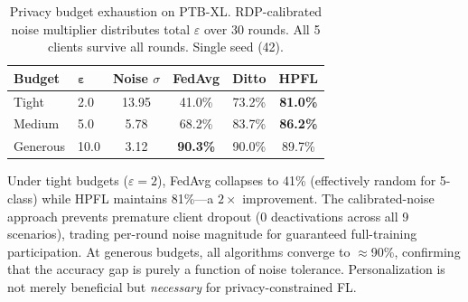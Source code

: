 \documentclass[conference,a4paper]{IEEEtran}
\begin{document}
\begin{table}[htbp]
\centering
\caption{Privacy budget exhaustion on PTB-XL. RDP-calibrated noise multiplier distributes total $\varepsilon$ over 30 rounds. All 5 clients survive all rounds. Single seed (42).}
\label{tab:budget_exhaustion}
\small
\begin{tabular}{llcccc}
\toprule
\textbf{Budget} & $\boldsymbol{\varepsilon}$ & \textbf{Noise $\sigma$} & \textbf{FedAvg} & \textbf{Ditto} & \textbf{HPFL} \\
\midrule
Tight & 2.0 & 13.95 & 41.0\% & 73.2\% & \textbf{81.0\%} \\
Medium & 5.0 & 5.78 & 68.2\% & 83.7\% & \textbf{86.2\%} \\
Generous & 10.0 & 3.12 & \textbf{90.3\%} & 90.0\% & 89.7\% \\
\bottomrule
\end{tabular}

\vspace{1mm}
\footnotesize{Under tight budgets ($\varepsilon{=}2$), FedAvg collapses to 41\% (effectively random for 5-class) while HPFL maintains 81\%---a $2\times$ improvement. The calibrated-noise approach prevents premature client dropout (0 deactivations across all 9 scenarios), trading per-round noise magnitude for guaranteed full-training participation. At generous budgets, all algorithms converge to $\approx$90\%, confirming that the accuracy gap is purely a function of noise tolerance. Personalization is not merely beneficial but \textit{necessary} for privacy-constrained FL.}
\end{table}

\end{document}
